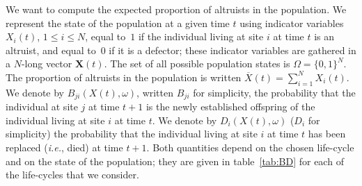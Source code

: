 \documentclass[11pt, letterpaper]{article}
\newcommand{\ie}{\textit{i.e.}}
\begin{document}
We want to compute the expected proportion of altruists in the population. We represent the state of the population at a given time $t$ using indicator variables $X_i(t)$, $1\leq i \leq N$, equal to~$1$ if the individual living at site $i$ at time $t$ is an altruist, and equal to~$0$ if it is a defector; these indicator variables are gathered in a $N$-long vector $\mathbf{X}(t)$. The set of all possible population states is $\Omega = \{0,1\}^N$. The proportion of altruists in the population is written $\overline{X}(t) = \sum_{i=1}^N X_i(t)$. We denote by $B_{ji}(X(t), \omega)$, written $B_{ji}$ for simplicity, the probability that the individual at site $j$ at time $t+1$ is the newly established offspring of the individual living at site $i$ at time $t$. We denote by $D_{i}(X(t), \omega)$ ($D_i$ for simplicity) the probability that the individual living at site $i$ at time $t$ has been replaced (\ie, died) at time $t+1$. Both quantities depend on the chosen life-cycle and on the state of the population; they are given in table~\ref{tab:BD} for each of the life-cycles that we consider. 
\end{document}
